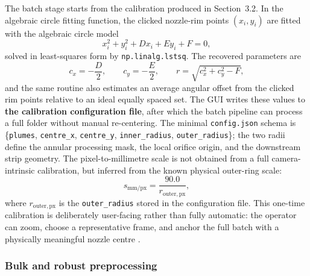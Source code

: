 \documentclass[english, 12pt, a4paper, elec, utf8, a-2b, online]{aaltothesis}
\begin{document}
The batch stage starts from the calibration produced in Section~3.2. In the algebraic circle fitting function, the clicked nozzle-rim points \((x_i,y_i)\) are fitted with the algebraic circle model
\[
x_i^2+y_i^2 + D x_i + E y_i + F = 0,
\]
solved in least-squares form by \texttt{np.linalg.lstsq}. The recovered parameters are
\[
c_x=-\frac{D}{2}, \qquad c_y=-\frac{E}{2}, \qquad r=\sqrt{c_x^2+c_y^2-F},
\]
and the same routine also estimates an average angular offset from the clicked rim points relative to an ideal equally spaced set. The GUI writes these values to \textbf{the calibration configuration file}, after which the batch pipeline can process a full folder without manual re-centering. The minimal \texttt{config.json} schema is \{\texttt{plumes}, \texttt{centre\_x}, \texttt{centre\_y}, \texttt{inner\_radius}, \texttt{outer\_radius}\}; the two radii define the annular processing mask, the local orifice origin, and the downstream strip geometry. The pixel-to-millimetre scale is not obtained from a full camera-intrinsic calibration, but inferred from the known physical outer-ring scale:
\[
s_{\mathrm{mm/px}}=\frac{90.0}{r_{\mathrm{outer,px}}},
\]
where \(r_{\mathrm{outer,px}}\) is the \texttt{outer\_radius} stored in the configuration file. This one-time calibration is deliberately user-facing rather than fully automatic: the operator can zoom, choose a representative frame, and anchor the full batch with a physically meaningful nozzle centre \cite{Pratt1987CircleFit,Taubin1991CircleFit}.

\subsubsection{Bulk and robust preprocessing}
\end{document}
